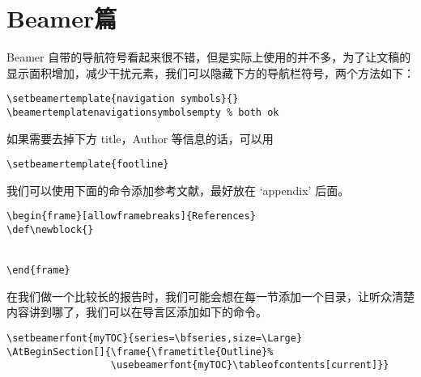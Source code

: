 %
%
%
%

\section{Beamer篇}



Beamer
自带的导航符号看起来很不错，但是实际上使用的并不多，为了让文稿的显示面积增加，减少干扰元素，我们可以隐藏下方的导航栏符号，两个方法如下：

\begin{verbatim}
\setbeamertemplate{navigation symbols}{}
\beamertemplatenavigationsymbolsempty % both ok
\end{verbatim}

如果需要去掉下方 title，Author 等信息的话，可以用

\begin{verbatim}
\setbeamertemplate{footline}
\end{verbatim}



我们可以使用下面的命令添加参考文献，最好放在 `appendix' 后面。

\begin{verbatim}
\begin{frame}[allowframebreaks]{References}
\def\newblock{}


\end{frame}
\end{verbatim}



在我们做一个比较长的报告时，我们可能会想在每一节添加一个目录，让听众清楚内容讲到哪了，我们可以在导言区添加如下的命令。

\begin{verbatim}
\setbeamerfont{myTOC}{series=\bfseries,size=\Large}
\AtBeginSection[]{\frame{\frametitle{Outline}%
                  \usebeamerfont{myTOC}\tableofcontents[current]}}
\end{verbatim}

